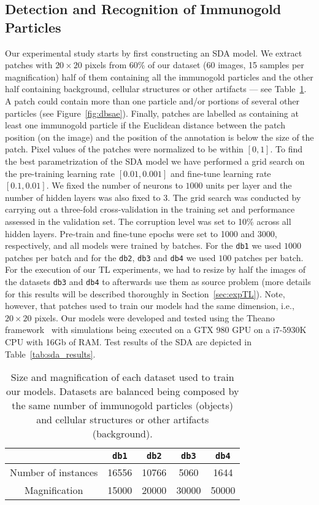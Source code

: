 \documentclass[a4paper,11pt]{article}
\newcommand{\1}{\mathbbm{1}}
\newcommand{\fref}[1]{Figure~\ref{#1}}
\newcommand{\tref}[1]{Table~\ref{#1}}
\newcommand{\sref}[1]{Section~\ref{#1}}
\newcommand{\db}[1]{\texttt{#1}}
\theoremstyle{plain}
\begin{document}
\subsection{Detection and Recognition of Immunogold Particles}\label{sec:expLOG}
Our experimental study starts by first constructing an \ac{SDA} model. We extract patches with $20\times 20$ pixels from 60\% of our dataset (60 images, 15 samples per magnification) half of them containing all the immunogold particles and the other half containing background, cellular structures or other artifacts --- see \tref{tab:DBSIZE}.
A patch could contain more than one particle and/or portions of several other particles (see \fref{fig:dbsae}). Finally, patches are labelled as containing at least one immunogold particle if the Euclidean distance between the patch position (on the image) and the position of the annotation is below the size of the patch.
Pixel values of the patches were normalized to be within $[0,1]$. To find the best parametrization of the \ac{SDA} model we have performed a grid search on the pre-training learning rate $[0.01, 0.001]$ and fine-tune learning rate $[0.1, 0.01]$.
We fixed the number of neurons to $1000$ units per layer and the number of hidden layers was also fixed to $3$.
The grid search was conducted by carrying out a three-fold cross-validation in the training set and performance assessed in the validation set. The corruption level was set to 10\% across all hidden layers.
Pre-train and fine-tune epochs were set to 1000 and 3000, respectively, and all models were trained by batches. For the \db{db1} we used $1000$ patches per batch and for the \db{db2}, \db{db3} and \db{db4} we used $100$ patches per batch.
For the execution of our \ac{TL} experiments, we had to resize by half the images of the datasets \db{db3} and \db{db4} to afterwards use them as source problem (more details for this results will be described thoroughly in \sref{sec:expTL}). Note, however, that patches used to train our models had the same dimension, i.e., $20 \times 20$ pixels.
Our models were developed and tested using the Theano framework~\cite{theano2012,theano2010} with simulations being executed on a GTX 980 GPU on a i7-5930K CPU with 16Gb of RAM.
Test results of the \ac{SDA} are depicted in \tref{tab:sda_results}.

\begin{table}[!htp]
  \centering
  \caption{Size and magnification of each dataset used to train our models. Datasets are balanced being composed by the same number of immunogold particles (objects) and cellular structures or other artifacts (background).}
  \label{tab:DBSIZE}
  \begin{tabular}{c|cccc}
    \hline\hline
                 & \db{db1} &  \db{db2} & \db{db3} & \db{db4}\\
    \hline
    Number of instances & 16556    &  10766    & 5060     &  1644\\
    Magnification & 15000  & 20000  & 30000 & 50000 \\
    \hline\hline
  \end{tabular}
\end{table}
\end{document}
